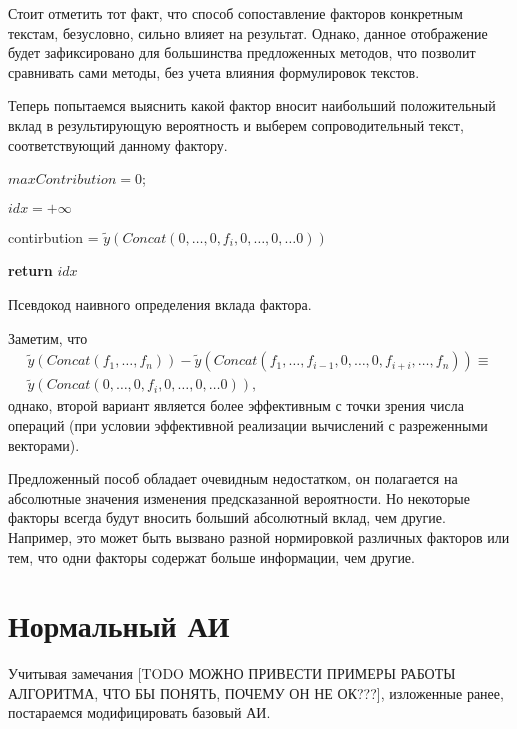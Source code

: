\documentclass[12pt,a4paper]{report}
\begin{document}
Стоит отметить тот факт, что способ сопоставление факторов конкретным текстам, безусловно, сильно влияет на результат. Однако, данное отображение будет зафиксировано для большинства предложенных методов, что позволит сравнивать сами методы, без учета влияния формулировок текстов.

Теперь попытаемся выяснить какой фактор вносит наибольший положительный вклад в результирующую вероятность и выберем сопроводительный текст, соответствующий данному фактору.

\begin{algorithm}[H]
\SetAlgoLined
{}

$maxContribution = 0$;

$idx = +\infty$

 {

contirbution = $\tilde{y}(Concat(0, \dots, 0, f_{i}, 0, \dots, 0, \dots 0))$

}

\textbf{return} $idx$
\caption{Псевдокод наивного определения вклада фактора.}
\label{alg:naiveAI}
\end{algorithm}

Заметим, что 
\begin{eqnarray}
\tilde{y}(Concat(f_1, \dots, f_n)) - \tilde{y}(Concat(f_1, \dots, f_{i-1}, 0, \dots, 0, f_{i+i}, \dots, f_n)) \equiv \nonumber \\ \tilde{y}(Concat(0, \dots, 0, f_{i}, 0, \dots, 0, \dots 0)),
\end{eqnarray}
однако, второй вариант является более эффективным с точки зрения числа операций (при условии эффективной реализации вычислений с разреженными векторами).

Предложенный пособ обладает очевидным недостатком, он полагается на абсолютные значения изменения предсказанной вероятности. Но некоторые факторы всегда будут вносить больший абсолютный вклад, чем другие. Например, это может быть вызвано разной нормировкой различных факторов или тем, что одни факторы содержат больше информации, чем другие.

\section{Нормальный АИ}
Учитывая замечания [TODO МОЖНО ПРИВЕСТИ ПРИМЕРЫ РАБОТЫ АЛГОРИТМА, ЧТО БЫ ПОНЯТЬ, ПОЧЕМУ ОН НЕ ОК???], изложенные ранее, постараемся модифицировать базовый АИ.
\end{document}
